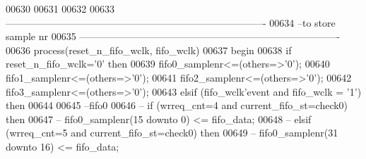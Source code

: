 \begin{DoxyCode}
00630     
00631     
00632     
00633 \textcolor{keyword}{-------------------------------------------------------------------------------    }
00634 \textcolor{keyword}{--to store sample nr}
00635 \textcolor{keyword}{-------------------------------------------------------------------------------}
00636   \textcolor{keywordflow}{process}(reset_n_fifo_wclk, fifo_wclk)
00637 \textcolor{vhdlkeyword}{    begin}
00638       \textcolor{keywordflow}{if} \textcolor{vhdlchar}{reset_n_fifo_wclk}\textcolor{vhdlchar}{=}\textcolor{vhdlchar}{'}\textcolor{vhdllogic}{}\textcolor{vhdllogic}{0}\textcolor{vhdlchar}{'} \textcolor{keywordflow}{then}
00639         \textcolor{vhdlchar}{fifo0_samplenr}\textcolor{vhdlchar}{<=}\textcolor{vhdlchar}{(}\textcolor{keywordflow}{others}\textcolor{vhdlchar}{=}\textcolor{vhdlchar}{>}\textcolor{vhdlchar}{'}\textcolor{vhdllogic}{}\textcolor{vhdllogic}{0}\textcolor{vhdlchar}{'}\textcolor{vhdlchar}{)};
00640         \textcolor{vhdlchar}{fifo1_samplenr}\textcolor{vhdlchar}{<=}\textcolor{vhdlchar}{(}\textcolor{keywordflow}{others}\textcolor{vhdlchar}{=}\textcolor{vhdlchar}{>}\textcolor{vhdlchar}{'}\textcolor{vhdllogic}{}\textcolor{vhdllogic}{0}\textcolor{vhdlchar}{'}\textcolor{vhdlchar}{)};
00641         \textcolor{vhdlchar}{fifo2_samplenr}\textcolor{vhdlchar}{<=}\textcolor{vhdlchar}{(}\textcolor{keywordflow}{others}\textcolor{vhdlchar}{=}\textcolor{vhdlchar}{>}\textcolor{vhdlchar}{'}\textcolor{vhdllogic}{}\textcolor{vhdllogic}{0}\textcolor{vhdlchar}{'}\textcolor{vhdlchar}{)};
00642           \textcolor{vhdlchar}{fifo3_samplenr}\textcolor{vhdlchar}{<=}\textcolor{vhdlchar}{(}\textcolor{keywordflow}{others}\textcolor{vhdlchar}{=}\textcolor{vhdlchar}{>}\textcolor{vhdlchar}{'}\textcolor{vhdllogic}{}\textcolor{vhdllogic}{0}\textcolor{vhdlchar}{'}\textcolor{vhdlchar}{)};
00643         \textcolor{keywordflow}{elsif} \textcolor{vhdlchar}{(}\textcolor{vhdlchar}{fifo_wclk}\textcolor{vhdlchar}{'}\textcolor{vhdlkeyword}{event} \textcolor{keywordflow}{and} \textcolor{vhdlchar}{fifo_wclk} \textcolor{vhdlchar}{=} \textcolor{vhdlchar}{'}\textcolor{vhdllogic}{}\textcolor{vhdllogic}{1}\textcolor{vhdlchar}{'}\textcolor{vhdlchar}{)} \textcolor{keywordflow}{then}
00644          
00645 \textcolor{keyword}{          --fifo0}
00646 \textcolor{keyword}{--        if (wrreq\_cnt=4 and current\_fifo\_st=check0) then }
00647 \textcolor{keyword}{--          fifo0\_samplenr(15 downto 0) <= fifo\_data;}
00648 \textcolor{keyword}{--        elsif (wrreq\_cnt=5 and current\_fifo\_st=check0) then}
00649 \textcolor{keyword}{--          fifo0\_samplenr(31 downto 16) <= fifo\_data;}

\end{DoxyCode}
